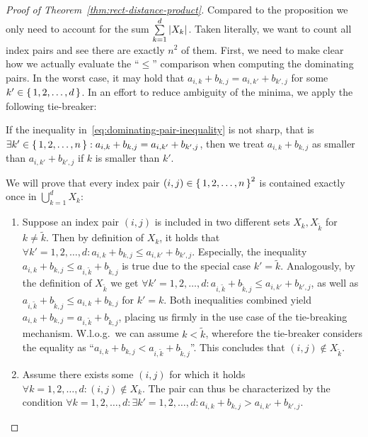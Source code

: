 \begin{proof}[Proof of Theorem~\ref{thm:rect-distance-product}]
    Compared to the proposition we only need to account for the sum $\sum\limits_{k = 1}^d \left\lvert X_k\right\rvert_{}$.
    Taken literally, we want to count all index pairs and see there are exactly $n^2$ of them.
    First, we need to make clear how we actually evaluate the ``$\leq$'' comparison when computing the dominating pairs.
    In the worst case, it may hold that $a_{i, k} + b_{k, j} = a_{i, k'} + b_{k', j}$ for some $k' \in \left\{\,1, 2, \dots, d\,\right\}$.
    In an effort to reduce ambiguity of the minima, we apply the following tie-breaker:
    \begin{displayquote}
        If the inequality in~\ref{eq:dominating-pair-inequality} is not sharp, that is $\exists k' \in \left\{\,1, 2, \dots, n\,\right\}: a_{i, k} + b_{k, j} = a_{i, k'} + b_{k', j}$, then we treat $a_{i, k} + b_{k, j}$ as smaller than $a_{i, k'} + b_{k', j}$ if $k$ is smaller than $k'$.
    \end{displayquote}
    We will prove that every index pair $(i, j) \in \left\{\,1, 2, \dots, n\,\right\}^2$ is contained exactly once in $\bigcup\limits_{k = 1}^d X_k$:
    \begin{enumerate}
        \item %
            Suppose an index pair $(i, j)$ is included in two different sets $X_k, X_{\tilde{k}}$ for $k \neq \tilde{k}$.
            Then by definition of $X_k$, it holds that $\forall k' = 1, 2, \dots, d: a_{i, k} + b_{k, j} \leq a_{i, k'} + b_{k', j}$.
            Especially, the inequality $a_{i, k} + b_{k, j} \leq a_{i, \tilde{k}} + b_{\tilde{k}, j}$ is true due to the special case $k' = \tilde{k}$.
            Analogously, by the definition of $X_{\tilde{k}}$ we get $\forall k' = 1, 2, \dots, d: a_{i, \tilde{k}} + b_{\tilde{k}, j} \leq a_{i, k'} + b_{k', j}$, as well as $a_{i, \tilde{k}} + b_{\tilde{k}, j} \leq a_{i, k} + b_{k, j}$ for $k' = k$.
            Both inequalities combined yield $a_{i, k} + b_{k, j} = a_{i, \tilde{k}} + b_{\tilde{k}, j}$, placing us firmly in the use case of the tie-breaking mechanism.
            W.l.o.g.\ we can assume $k < \tilde{k}$, wherefore the tie-breaker considers the equality as ``$a_{i, k} + b_{k, j} < a_{i, \tilde{k}} + b_{\tilde{k}, j}$''.
            This concludes that $(i, j) \not\in X_{\tilde{k}}$. \Lightning{}
        \item %
            Assume there exists some $(i, j)$ for which it holds $\forall k = 1, 2, \dots, d: (i, j) \not\in X_k$.
            The pair can thus be characterized by the condition $\forall k = 1, 2, \dots, d: \exists k' = 1, 2, \dots, d: a_{i, k} + b_{k, j} > a_{i, k'} + b_{k', j}$.

\end{enumerate}
\end{proof}
